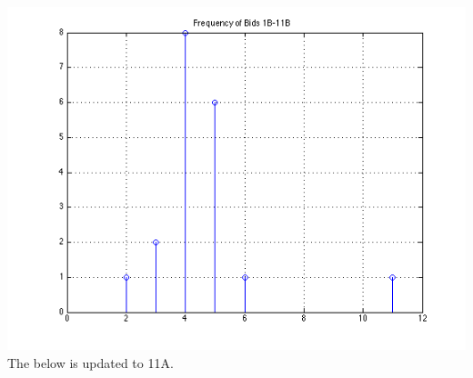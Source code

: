 \documentclass[leqno]{article}
\begin{document}
\includegraphics[scale=0.5]{140421_2}\\

The below is updated to 11A.\\
\end{document}
